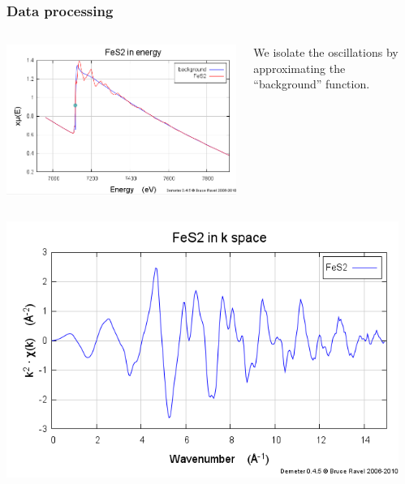 \documentclass[10pt, xcolor=x11names, compress, handout]{beamer}
\begin{document}
\begin{frame}
  \frametitle{Data processing}
  \begin{columns}
    \begin{column}{0.35\linewidth}
      \includegraphics[width=\linewidth]{JM/fes2_mubkg.png}
    \end{column}
    \begin{column}{0.65\linewidth}
      \small
      We isolate the oscillations by approximating the ``background''
      function.
    \end{column}
  \end{columns}
  \begin{columns}
    \begin{column}{0.35\linewidth}
      \includegraphics[width=\linewidth]{JM/fes2_chi.png}
    \end{column}
    \begin{column}{0.65\linewidth}
      \small

\end{column}
\end{columns}
\end{frame}
\end{document}
